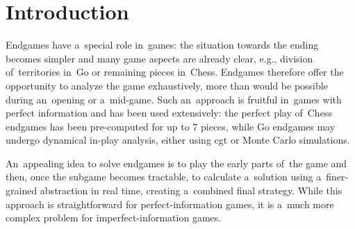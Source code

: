 \chapter*{Introduction}
Endgames have a~special role in~games:
the situation towards the ending becomes simpler and many game aspects are already clear, e.g., division of~territories in~Go or remaining pieces in~Chess.
Endgames therefore offer the opportunity to analyze the game exhaustively, more than would be possible during an~opening or a~mid-game.
Such an~approach is fruitful in~games with perfect information and has been used extensively:
the perfect play of~Chess endgames has been pre-computed for up to 7 pieces, while Go endgames may undergo dynamical in-play analysis, either using \acrlong{cgt} or Monte Carlo simulations.

An~appealing idea to solve endgames is to play the early parts of~the game and then, once the subgame becomes tractable, to calculate a~solution using a~finer-grained abstraction in real time, creating a~combined final strategy.
While this approach is straightforward for perfect-information games, it is a~much more complex problem for imperfect-information games. 

